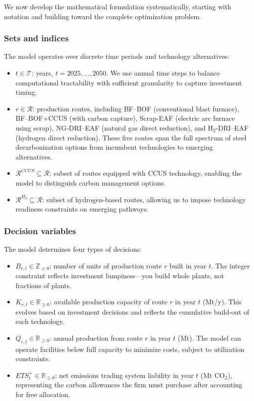 \documentclass[preprint,1p,authoryear]{elsarticle}
\begin{document}
We now develop the mathematical formulation systematically, starting with notation and building toward the complete optimization problem.

\subsubsection{Sets and indices}

The model operates over discrete time periods and technology alternatives:

\begin{itemize}[leftmargin=*]
    \item $t \in \mathcal{T}$: years, $t = 2025, \dots, 2050$. We use annual time steps to balance computational tractability with sufficient granularity to capture investment timing.
    \item $r \in \mathcal{R}$: production routes, including BF--BOF (conventional blast furnace), BF--BOF+CCUS (with carbon capture), Scrap-EAF (electric arc furnace using scrap), NG-DRI--EAF (natural gas direct reduction), and H$_2$-DRI--EAF (hydrogen direct reduction). These five routes span the full spectrum of steel decarbonization options from incumbent technologies to emerging alternatives.
    \item $\mathcal{R}^{CCUS} \subseteq \mathcal{R}$: subset of routes equipped with CCUS technology, enabling the model to distinguish carbon management options.
    \item $\mathcal{R}^{H_2} \subseteq \mathcal{R}$: subset of hydrogen-based routes, allowing us to impose technology readiness constraints on emerging pathways.
\end{itemize}

\subsubsection{Decision variables}

The model determines four types of decisions:

\begin{itemize}[leftmargin=*]
    \item $B_{r,t} \in \mathbb{Z}_{\ge 0}$: number of units of production route $r$ built in year $t$. The integer constraint reflects investment lumpiness—you build whole plants, not fractions of plants.
    \item $K_{r,t} \in \mathbb{R}_{\ge 0}$: available production capacity of route $r$ in year $t$ (Mt/y). This evolves based on investment decisions and reflects the cumulative build-out of each technology.
    \item $Q_{r,t} \in \mathbb{R}_{\ge 0}$: annual production from route $r$ in year $t$ (Mt). The model can operate facilities below full capacity to minimize costs, subject to utilization constraints.
    \item $ETS_{t}^{+} \in \mathbb{R}_{\ge 0}$: net emissions trading system liability in year $t$ (Mt CO$_2$), representing the carbon allowances the firm must purchase after accounting for free allocation.
\end{itemize}
\end{document}
